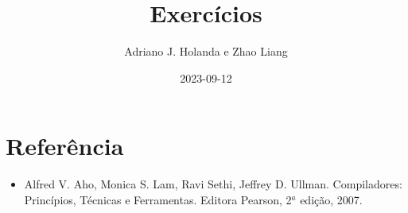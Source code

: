 \documentclass{article}
\begin{document}
\title{Exercícios}
\author{Adriano J. Holanda e Zhao Liang}
\date{2023-09-12}
\maketitle


%

\section*{Referência}
\begin{itemize}
\item Alfred V. Aho, Monica S. Lam, Ravi Sethi, Jeffrey
  D. Ullman. Compiladores: Princípios, Técnicas e Ferramentas. Editora
  Pearson, 2$^a$ edição, 2007.
\end{itemize}
\end{document}
